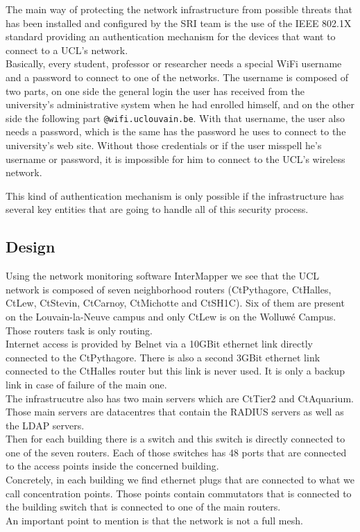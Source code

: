 The main way of protecting the network infrastructure from possible threats that has been installed and configured by the SRI team is the use of the IEEE 802.1X standard providing an authentication mechanism for the devices that want to connect to a UCL's network.\\
Basically, every student, professor or researcher needs a special WiFi username and a password to connect to one of the networks. The username is composed of two parts, on one side the general login the user has received from the university's administrative system when he had enrolled himself, and on the other side the following part \texttt{@wifi.uclouvain.be}. With that username, the user also needs a password, which is the same has the password he uses to connect to the university's web site. Without those credentials or if the user misspell he's username or password, it is impossible for him to connect to the UCL's wireless network.

This kind of authentication mechanism is only possible if the infrastructure has several key entities that are going to handle all of this security process.




\subsection{Design}
Using the network monitoring software InterMapper\cite{intermapper} we see that the UCL network is composed of seven neighborhood routers (CtPythagore, CtHalles, CtLew, CtStevin, CtCarnoy, CtMichotte and CtSH1C). Six of them are present on the Louvain-la-Neuve campus and only CtLew is on the Wolluwé Campus. Those routers task is only routing.\\

Internet access is provided by Belnet via a 10GBit ethernet link directly connected to the CtPythagore. There is also a second 3GBit ethernet link connected to the CtHalles router but this link is never used. It is only a backup link in case of failure of the main one.\\

The infrastrucutre also has two main servers which are CtTier2 and CtAquarium. Those main servers are datacentres that contain the RADIUS servers as well as the LDAP servers.\\

Then for each building there is a switch and this switch is directly connected to one of the seven routers. Each of those switches has 48 ports that are connected to the access points inside the concerned building.\\
Concretely, in each building we find ethernet plugs that are connected to what we call concentration points. Those points contain commutators that is connected to the building switch that is connected to one of the main routers.\\
An important point to mention is that the network is not a full mesh.\\

